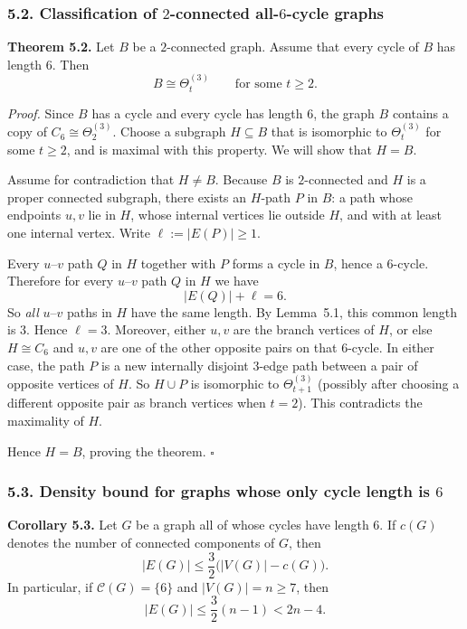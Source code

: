 \subsubsection*{5.2. Classification of $2$-connected all-$6$-cycle graphs}

\textbf{Theorem 5.2.}
Let $B$ be a $2$-connected graph.
Assume that every cycle of $B$ has length $6$.
Then
\[
B\cong \Theta_t^{(3)}
\qquad\text{for some }t\ge 2.
\]

\medskip
\textit{Proof.}
Since $B$ has a cycle and every cycle has length $6$, the graph $B$ contains a copy of $C_6\cong \Theta_2^{(3)}$.
Choose a subgraph $H\subseteq B$ that is isomorphic to $\Theta_t^{(3)}$ for some $t\ge 2$, and is maximal with this property.
We will show that $H=B$.

Assume for contradiction that $H\ne B$.
Because $B$ is $2$-connected and $H$ is a proper connected subgraph, there exists an $H$-path $P$ in $B$: a path whose endpoints $u,v$ lie in $H$, whose internal vertices lie outside $H$, and with at least one internal vertex.
Write $\ell:=|E(P)|\ge 1$.

Every $u$--$v$ path $Q$ in $H$ together with $P$ forms a cycle in $B$, hence a $6$-cycle.
Therefore for every $u$--$v$ path $Q$ in $H$ we have
\[
|E(Q)|+\ell=6.
\]
So \emph{all} $u$--$v$ paths in $H$ have the same length.
By Lemma~5.1, this common length is $3$.
Hence $\ell=3$.
Moreover, either $u,v$ are the branch vertices of $H$, or else $H\cong C_6$ and $u,v$ are one of the other opposite pairs on that $6$-cycle.
In either case, the path $P$ is a new internally disjoint $3$-edge path between a pair of opposite vertices of $H$.
So $H\cup P$ is isomorphic to $\Theta_{t+1}^{(3)}$ (possibly after choosing a different opposite pair as branch vertices when $t=2$).
This contradicts the maximality of $H$.

Hence $H=B$, proving the theorem. \hfill$\square$

\subsubsection*{5.3. Density bound for graphs whose only cycle length is $6$}

\textbf{Corollary 5.3.}
Let $G$ be a graph all of whose cycles have length $6$.
If $c(G)$ denotes the number of connected components of $G$, then
\[
|E(G)|\le \frac32\bigl(|V(G)|-c(G)\bigr).
\]
In particular, if $\mathcal C(G)=\{6\}$ and $|V(G)|=n\ge 7$, then
\[
|E(G)|\le \frac32(n-1)<2n-4.
\]

